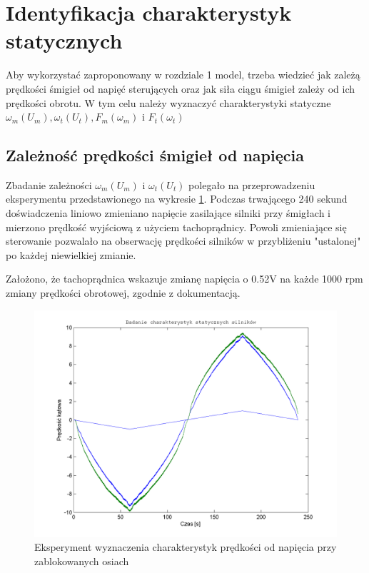 \section{Identyfikacja charakterystyk statycznych}

Aby wykorzystać zaproponowany w rozdziale 1 model, trzeba wiedzieć jak zależą prędkości śmigieł od napięć sterujących oraz jak siła ciągu śmigieł zależy od ich prędkości obrotu. W tym celu należy wyznaczyć charakterystyki statyczne $\omega_m(U_m), \omega_t(U_t), F_m(\omega_m)$ i $F_t(\omega_t)$

\subsection{Zależność prędkości śmigieł od napięcia}

Zbadanie zależności $\omega_m(U_m)$ i $\omega_t(U_t)$ polegało na przeprowadzeniu eksperymentu przedstawionego na wykresie \ref{rys:pr_silniki}. Podczas trwającego 240 sekund doświadczenia liniowo zmieniano napięcie zasilające silniki przy śmigłach i mierzono prędkość wyjściową z użyciem tachoprądnicy. Powoli zmieniające się sterowanie pozwalało na obserwację prędkości silników w przybliżeniu "ustalonej" po każdej niewielkiej zmianie.

Założono, że tachoprądnica wskazuje zmianę napięcia o 0.52V na każde 1000 rpm zmiany prędkości obrotowej, zgodnie z dokumentacją.%

\begin{figure}[!htb]
\centering
\includegraphics[scale=0.85]{img/predkosc_silniki.png}
\caption{Eksperyment wyznaczenia charakterystyk prędkości od napięcia przy zablokowanych osiach}
\label{rys:pr_silniki}
\end{figure}

